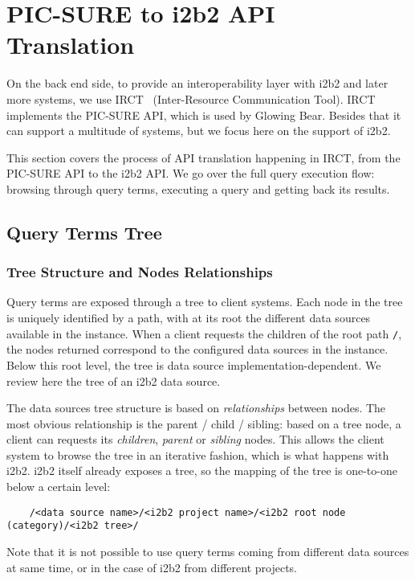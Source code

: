 

\section{PIC-SURE to i2b2 API Translation}
\label{sec:interoplayer-picsure}

On the back end side, to provide an interoperability layer with i2b2 and later more systems, we use IRCT~\cite{github:IRCT} (Inter-Resource Communication Tool).
IRCT implements the PIC-SURE API, which is used by Glowing Bear.
Besides that it can support a multitude of systems, but we focus here on the support of i2b2.

This section covers the process of API translation happening in IRCT, from the PIC-SURE API to the i2b2 API.
We go over the full query execution flow: browsing through query terms, executing a query and getting back its results.


\subsection{Query Terms Tree}

\subsubsection{Tree Structure and Nodes Relationships}

Query terms are exposed through a tree to client systems.
Each node in the tree is uniquely identified by a path, with at its root the different data sources available in the instance.
When a client requests the children of the root path \verb|/|, the nodes returned correspond to the configured data sources in the instance.
Below this root level, the tree is data source implementation-dependent.
We review here the tree of an i2b2 data source.

The data sources tree structure is based on \emph{relationships} between nodes.
The most obvious relationship is the parent / child / sibling: based on a tree node, a client can requests its \emph{children}, \emph{parent} or \emph{sibling} nodes.
This allows the client system to browse the tree in an iterative fashion, which is what happens with i2b2.
i2b2 itself already exposes a tree, so the mapping of the tree is one-to-one below a certain level:
\begin{verbatim}
    /<data source name>/<i2b2 project name>/<i2b2 root node (category)/<i2b2 tree>/
\end{verbatim}
Note that it is not possible to use query terms coming from different data sources at same time, or in the case of i2b2 from different projects.

